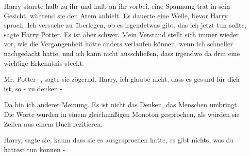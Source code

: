 Harry starrte halb zu ihr und halb an ihr vorbei, eine Spannung trat in sein
Gesicht, während sie den Atem anhielt. Es dauerte eine Weile, bevor Harry
sprach. \glqq Ich versuche zu überlegen, ob es irgendetwas gibt, das ich jetzt
tun sollte\grqq{}, sagte Harry Potter. \glqq Es ist aber schwer. Mein Verstand
stellt sich immer wieder vor, wie die Vergangenheit hätte anders verlaufen
können, wenn ich schneller nachgedacht hätte, und ich kann nicht ausschließen,
dass irgendwo da drin eine wichtige Erkenntnis steckt.\grqq{}

\glqq Mr. Potter -\grqq{}, sagte sie zögernd. \glqq Harry, ich glaube nicht,
dass es gesund für dich ist, so - zu denken -\grqq{}

\glqq Da bin ich anderer Meinung. Es ist nicht das Denken, das Menschen
umbringt.\grqq{} Die Worte wurden in einem gleichmäßigen Monoton gesprochen, als
würden sie Zeilen aus einem Buch rezitieren.

\glqq Harry\grqq{}, sagte sie, kaum dass sie es ausgesprochen hatte, \glqq es
gibt nichts, was du hättest tun können -\grqq{}

